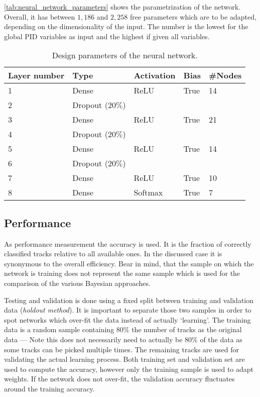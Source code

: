 \autoref{tab:neural_network_parameters} shows the parametrization of the network. Overall, it has between $1,186$ and $2,258$ free parameters which are to be adapted, depending on the dimensionality of the input. The number is the lowest for the global PID variables as input and the highest if given all variables.

\begin{table}[ht]
	\centering
	\begin{tabular}{l|llll}
		Layer number & Type & Activation & Bias & \#Nodes  \\
		\hline
		1 & Dense & ReLU & True & 14 \\
		2 & Dropout ($20\%$) \\
		3 & Dense & ReLU & True & 21 \\
		4 & Dropout ($20\%$) \\
		5 & Dense & ReLU & True & 14 \\
		6 & Dropout ($20\%$) \\
		7 & Dense & ReLU & True & 10 \\
		8 & Dense & Softmax & True & 7
	\end{tabular}
	\caption{Design parameters of the neural network.}
	\label{tab:neural_network_parameters}
\end{table}

\subsection{Performance}
\label{subsec:neural_network_performance}

As performance measurement the accuracy is used. It is the fraction of correctly classified tracks relative to all available ones. In the discussed case it is synonymous to the overall efficiency. Bear in mind, that the sample on which the network is training does not represent the same sample which is used for the comparison of the various Bayesian approaches.

Testing and validation is done using a fixed split between training and validation data (\textit{holdout method}). It is important to separate those two samples in order to spot networks which over-fit the data instead of actually `learning'. The training data is a random sample containing $80\%$ the number of tracks as the original data --- Note this does not necessarily need to actually be $80\%$ of the data as some tracks can be picked multiple times. The remaining tracks are used for validating the actual learning process. Both training set and validation set are used to compute the accuracy, however only the training sample is used to adapt weights. If the network does not over-fit, the validation accuracy fluctuates around the training accuracy.

